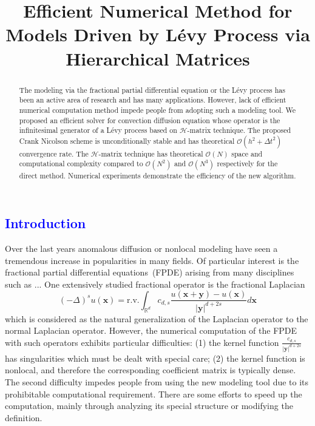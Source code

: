 \documentclass[10pt,a4paper]{article}
\title{Efficient Numerical Method for Models Driven by L\'evy Process via Hierarchical Matrices}
\date{}
\newcommand{\RR}[0]{\mathbb{R}}
\newcommand{\bx}[0]{\mathbf{x}}
\newcommand{\lib}[1]{\textcolor{blue}{\section{#1}}}
\theoremstyle{definition}
\newcommand{\by}[0]{\mathbf{y}}
\begin{document}
\maketitle
\begin{abstract}
	The modeling via the fractional partial differential equation or the L\'evy process has been an active area of research and has many applications. However, lack of efficient numerical computation method impede people from adopting such a modeling tool. We proposed an efficient solver for convection diffusion equation whose operator is the infinitesimal generator of a L\'evy process based on $\mathcal{H}$-matrix technique. The proposed Crank Nicolson scheme is unconditionally stable and has theoretical $\mathcal{O}(h^2+\Delta t^2)$ convergence rate. The $\mathcal{H}$-matrix technique has theoretical $\mathcal{O}(N)$ space and computational complexity compared to $\mathcal{O}(N^2)$ and $\mathcal{O}(N^3)$ respectively for the direct method. Numerical experiments demonstrate the efficiency of the new algorithm. 
\end{abstract}

\lib{Introduction}
Over the last years anomalous diffusion or nonlocal modeling have seen a tremendous increase in popularities in many fields. Of particular interest is the fractional partial differential equations~(FPDE) arising from many disciplines such as ... One extensively studied fractional operator is the fractional Laplacian 
\begin{equation}
	(-\Delta)^s u(\bx)=\mathrm{r.v.}\int_{\RR^d} c_{d,s}\frac{u(\bx+\by)-u(\bx)}{|\by|^{d+2s}}d\bx
\end{equation}
which is considered as the natural generalization of the Laplacian operator to the normal Laplacian operator. However, the numerical computation of the FPDE with such operators exhibits particular difficulties: (1) the kernel function $\frac{c_{d,s}}{|\by|^{d+2s}}$ has singularities which must be dealt with special care; (2) the kernel function is nonlocal, and therefore the corresponding coefficient matrix is typically dense. The second difficulty impedes people from using the new modeling tool due to its prohibitable computational requirement. There are some efforts to speed up the computation, mainly through analyzing its special structure or modifying the definition. 
\end{document}
